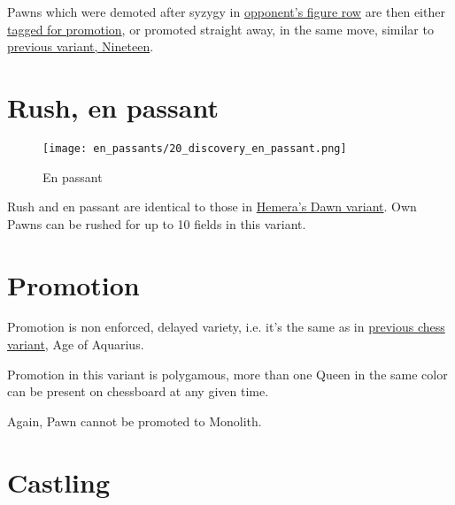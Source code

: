Pawns which were demoted after syzygy in
\hyperref[sec:Terms/Figure row]{opponent's figure row}
are then either \hyperref[sec:Age of Aquarius/Promotion]{tagged for promotion},
or promoted straight away, in the same move, similar to
\hyperref[fig:scn_n_11_teleport_pawns_init]{previous variant, Nineteen}.

\clearpage %

\section*{Rush, en passant}

\vspace*{-1.2\baselineskip}
\noindent
\begin{figure}[!h]
\texttt{[image: en\_passants/20\_discovery\_en\_passant.png]}
\caption{En passant}
\label{fig:20_discovery_en_passant}
\end{figure}

Rush and en passant are identical to those in \hyperref[fig:14_hemera_s_dawn_en_passant]{Hemera's Dawn variant}.
Own Pawns can be rushed for up to 10 fields in this variant.

\clearpage %

\section*{Promotion}

Promotion is non enforced, delayed variety, i.e. it's the same as in
\hyperref[sec:Age of Aquarius/Promotion]{previous chess variant}, Age of Aquarius.

Promotion in this variant is polygamous, more than one Queen in the same color
can be present on chessboard at any given time.

Again, Pawn cannot be promoted to Monolith.

\clearpage %

\section*{Castling}

